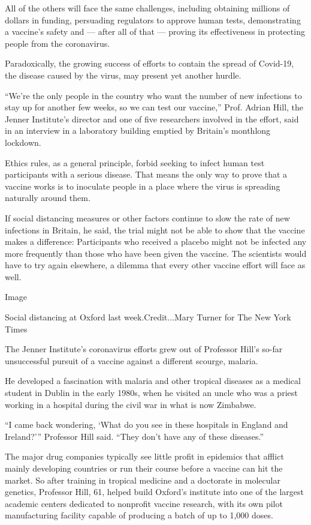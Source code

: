 All of the others will face the same challenges, including obtaining
millions of dollars in funding, persuading regulators to approve human
tests, demonstrating a vaccine's safety and --- after all of that ---
proving its effectiveness in protecting people from the coronavirus.

Paradoxically, the growing success of efforts to contain the spread of
Covid-19, the disease caused by the virus, may present yet another
hurdle.

``We're the only people in the country who want the number of new
infections to stay up for another few weeks, so we can test our
vaccine,'' Prof. Adrian Hill, the Jenner Institute's director and one of
five researchers involved in the effort, said in an interview in a
laboratory building emptied by Britain's monthlong lockdown.

Ethics rules, as a general principle, forbid seeking to infect human
test participants with a serious disease. That means the only way to
prove that a vaccine works is to inoculate people in a place where the
virus is spreading naturally around them.

If social distancing measures or other factors continue to slow the rate
of new infections in Britain, he said, the trial might not be able to
show that the vaccine makes a difference: Participants who received a
placebo might not be infected any more frequently than those who have
been given the vaccine. The scientists would have to try again
elsewhere, a dilemma that every other vaccine effort will face as well.

Image

Social distancing at Oxford last week.Credit...Mary Turner for The New
York Times

The Jenner Institute's coronavirus efforts grew out of Professor Hill's
so-far unsuccessful pursuit of a vaccine against a different scourge,
malaria.

He developed a fascination with malaria and other tropical diseases as a
medical student in Dublin in the early 1980s, when he visited an uncle
who was a priest working in a hospital during the civil war in what is
now Zimbabwe.

``I came back wondering, `What do you see in these hospitals in England
and Ireland?''' Professor Hill said. ``They don't have any of these
diseases.''

The major drug companies typically see little profit in epidemics that
afflict mainly developing countries or run their course before a vaccine
can hit the market. So after training in tropical medicine and a
doctorate in molecular genetics, Professor Hill, 61, helped build
Oxford's institute into one of the largest academic centers dedicated to
nonprofit vaccine research, with its own pilot manufacturing facility
capable of producing a batch of up to 1,000 doses.

